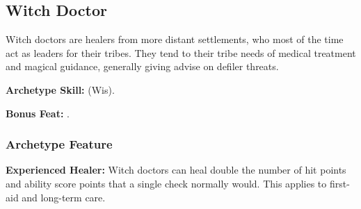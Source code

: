 \subsection{Witch Doctor}
Witch doctors are healers from more distant settlements, who most of the time act as leaders for their tribes. They tend to their tribe needs of medical treatment and magical guidance, generally giving advise on defiler threats.

\textbf{Archetype Skill:}  (Wis).

\textbf{Bonus Feat:} .

\subsubsection{Archetype Feature}
\textbf{Experienced Healer:} Witch doctors can heal double the number of hit points and ability score points that a single  check normally would. This applies to first-aid and long-term care.
